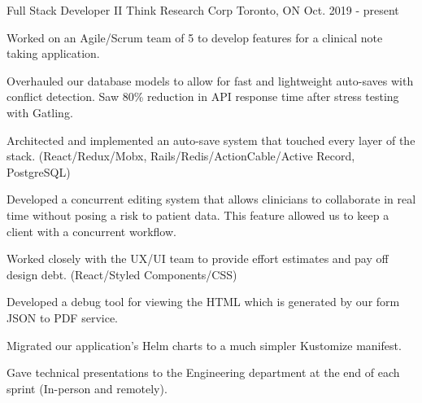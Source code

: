 

\begin{cventries}

  \cventry
    {Full Stack Developer II} %
    {Think Research Corp} %
    {Toronto, ON} %
    {Oct. 2019 - present} %
    {
      \begin{cvitems} %
        \item {Worked on an Agile/Scrum team of 5 to develop features for a clinical note taking application.}
        \item {Overhauled our database models to allow for fast and lightweight auto-saves with conflict detection. Saw 80\% reduction in API response time after stress testing with Gatling.}
        \item {Architected and implemented an auto-save system that touched every layer of the stack. (React/Redux/Mobx, Rails/Redis/ActionCable/Active Record, PostgreSQL)}
        \item {Developed a concurrent editing system that allows clinicians to collaborate in real time without posing a risk to patient data. This feature allowed us to keep a client with a concurrent workflow.}
        \item {Worked closely with the UX/UI team to provide effort estimates and pay off design debt. (React/Styled Components/CSS)}
        \item {Developed a debug tool for viewing the HTML which is generated by our form JSON to PDF service.}
        \item {Migrated our application's Helm charts to a much simpler Kustomize manifest.}
        \item {Gave technical presentations to the Engineering department at the end of each sprint (In-person and remotely).}
      \end{cvitems}
    }


\end{cventries}
